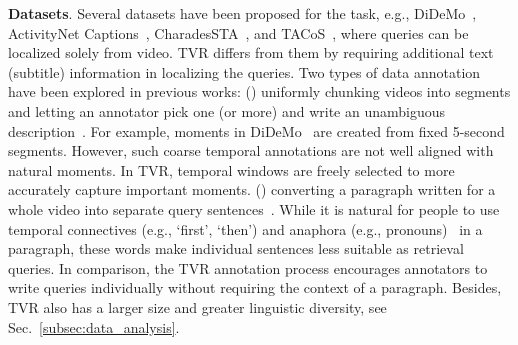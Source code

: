 \documentclass[runningheads]{llncs}
\begin{document}
\kern1mm
\noindent\textbf{Datasets}.
Several datasets have been proposed for the task, e.g., DiDeMo~\cite{anne2017localizing}, ActivityNet Captions~\cite{Krishna2017DenseCaptioningEI}, CharadesSTA~\cite{gao2017tall}, and TACoS~\cite{regneri2013grounding}, where queries can be localized solely from video.
TVR differs from them by requiring additional text (subtitle) information in localizing the queries.
Two types of data annotation have been explored in previous works:
() uniformly chunking videos into segments and letting an annotator pick one (or more) and write an unambiguous description~\cite{anne2017localizing}. 
For example, moments in DiDeMo~\cite{anne2017localizing} are created from fixed 5-second segments. 
However, such coarse temporal annotations are not well aligned with natural moments. 
In TVR, temporal windows are freely selected to more accurately capture important moments.
() converting a paragraph written for a whole video into separate query sentences~\cite{regneri2013grounding,gao2017tall,Krishna2017DenseCaptioningEI}.
While it is natural for people to use temporal connectives (e.g., `first', `then') and anaphora (e.g., pronouns)~\cite{rohrbach2014coherent} in a paragraph, these words make individual sentences less suitable as retrieval queries. 
In comparison, the TVR annotation process encourages annotators to write queries individually without requiring the context of a paragraph. 
Besides, TVR also has a larger size and greater linguistic diversity, see Sec.~\ref{subsec:data_analysis}.
\end{document}
